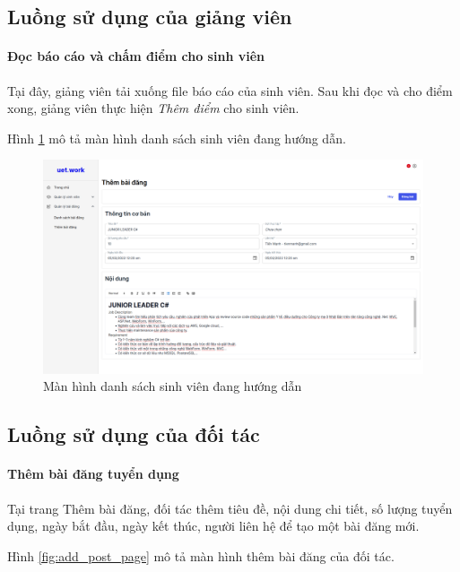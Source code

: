 \documentclass[./../main.tex]{subfiles}
\begin{document}
\subsection{Luồng sử dụng của giảng viên}

\paragraph*{Đọc báo cáo và chấm điểm cho sinh viên}

Tại đây, giảng viên tải xuống file báo cáo của sinh viên. Sau khi đọc và cho điểm xong, giảng viên thực hiện \emph{Thêm điểm} cho sinh viên.

Hình \ref{fig:working_student_page} mô tả màn hình danh sách sinh viên đang hướng dẫn.

\begin{figure}[]
	\includegraphics[width=\linewidth]{./images/image18.png} %
	\caption{Màn hình danh sách sinh viên đang hướng dẫn}
	\label{fig:working_student_page}
\end{figure}

\subsection{Luồng sử dụng của đối tác}

\paragraph*{Thêm bài đăng tuyển dụng}

Tại trang Thêm bài đăng, đối tác thêm tiêu đề, nội dung chi tiết, số lượng tuyển dụng, ngày bắt đầu, ngày kết thúc, người liên hệ để tạo một bài đăng mới.

Hình \ref{fig:add_post_page} mô tả màn hình thêm bài đăng của đối tác.
\end{document}
